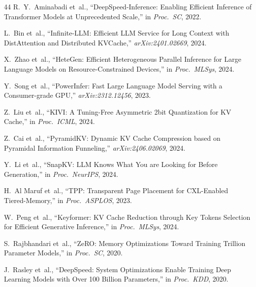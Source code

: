 \documentclass[conference]{IEEEtran}
\begin{document}
\begin{thebibliography}{44}
 R.~Y.~Aminabadi et~al., ``DeepSpeed-Inference: Enabling Efficient Inference of Transformer Models at Unprecedented Scale,'' in \textit{Proc.\ SC}, 2022.

 L.~Bin et~al., ``Infinite-LLM: Efficient LLM Service for Long Context with DistAttention and Distributed KVCache,'' \textit{arXiv:2401.02669}, 2024.

 X.~Zhao et~al., ``HeteGen: Efficient Heterogeneous Parallel Inference for Large Language Models on Resource-Constrained Devices,'' in \textit{Proc.\ MLSys}, 2024.

 Y.~Song et~al., ``PowerInfer: Fast Large Language Model Serving with a Consumer-grade GPU,'' \textit{arXiv:2312.12456}, 2023.

 Z.~Liu et~al., ``KIVI: A Tuning-Free Asymmetric 2bit Quantization for KV Cache,'' in \textit{Proc.\ ICML}, 2024.

 Z.~Cai et~al., ``PyramidKV: Dynamic KV Cache Compression based on Pyramidal Information Funneling,'' \textit{arXiv:2406.02069}, 2024.

 Y.~Li et~al., ``SnapKV: LLM Knows What You are Looking for Before Generation,'' in \textit{Proc.\ NeurIPS}, 2024.

 H.~Al Maruf et~al., ``TPP: Transparent Page Placement for CXL-Enabled Tiered-Memory,'' in \textit{Proc.\ ASPLOS}, 2023.

 W.~Peng et~al., ``Keyformer: KV Cache Reduction through Key Tokens Selection for Efficient Generative Inference,'' in \textit{Proc.\ MLSys}, 2024.

 S.~Rajbhandari et~al., ``ZeRO: Memory Optimizations Toward Training Trillion Parameter Models,'' in \textit{Proc.\ SC}, 2020.

 J.~Rasley et~al., ``DeepSpeed: System Optimizations Enable Training Deep Learning Models with Over 100 Billion Parameters,'' in \textit{Proc.\ KDD}, 2020.

\end{thebibliography}
\end{document}
